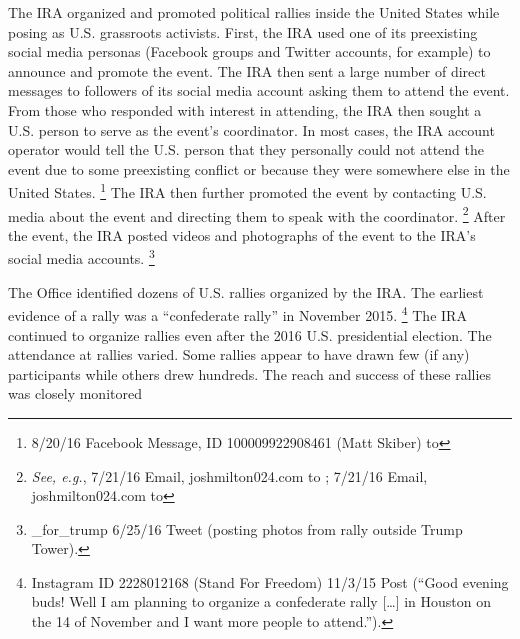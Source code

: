 The IRA organized and promoted political rallies inside the United States while posing as U.S. grassroots activists.
First, the IRA used one of its preexisting social media personas (Facebook groups and Twitter accounts, for example) to announce and promote the event.
The IRA then sent a large number of direct messages to followers of its social media account asking them to attend the event.
From those who responded with interest in attending, the IRA then sought a U.S. person to serve as the event's coordinator.
In most cases, the IRA account operator would tell the U.S. person that they personally could not attend the event due to some preexisting conflict or because they were somewhere else in the United States.%
\footnote{8/20/16 Facebook Message, ID 100009922908461 (Matt Skiber) to }
The IRA then further promoted the event by contacting U.S. media about the event and directing them to speak with the coordinator.%
\footnote{\textit{See, e.g.}, 7/21/16 Email, joshmilton024\@gmail.com to ;
7/21/16 Email, joshmilton024\@gmail.com to }
After the event, the IRA posted videos and photographs of the event to the IRA's  social media accounts.%
\footnote{\@march\_for\_trump 6/25/16 Tweet (posting photos from rally outside Trump Tower).}

The Office identified dozens of U.S. rallies organized by the IRA\null. The earliest evidence of a rally was a ``confederate rally'' in November 2015.%
\footnote{Instagram ID 2228012168 (Stand For Freedom) 11/3/15 Post (``Good evening buds!
Well I am planning to organize a confederate rally [\dots] in Houston on the 14 of November and I want more people to attend.'').}
The IRA continued to organize rallies even after the 2016 U.S. presidential election.
The attendance at rallies varied.
Some rallies appear to have drawn few (if any) participants while others drew hundreds.
The reach and success of these rallies was closely monitored 

